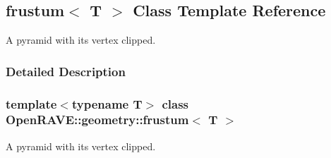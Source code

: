 \hypertarget{classOpenRAVE_1_1geometry_1_1frustum}{
\subsection{frustum$<$ T $>$ Class Template Reference}
\label{classOpenRAVE_1_1geometry_1_1frustum}
}


A pyramid with its vertex clipped.  




\subsubsection{Detailed Description}
\subsubsection*{template$<$typename T$>$ class OpenRAVE::geometry::frustum$<$ T $>$}

A pyramid with its vertex clipped. 